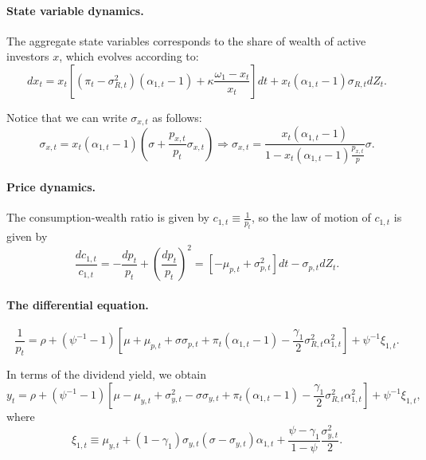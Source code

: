 \documentclass[11pt,english]{article}
\begin{document}
\paragraph{State variable dynamics.} The aggregate state variables corresponds to the share of wealth of active investors $x$, which evolves according to: 
\begin{equation}
d x_t = x_t \left[  (\pi_t-\sigma_{R,t}^2) (\alpha_{1,t}  -1)+ \kappa \frac{\omega_1 - x_t}{x_t} \right]dt + x_t (\alpha_{1,t}-1) \sigma_{R,t} dZ_t.
\end{equation}

Notice that we can write $\sigma_{x,t}$ as follows:
\begin{equation}
    \sigma_{x,t} = x_t (\alpha_{1,t}-1) \left(\sigma+\frac{p_{x,t}}{p_t} \sigma_{x,t}\right) \Rightarrow \sigma_{x,t} = \frac{x_t (\alpha_{1,t} -1)}{1- x_t (\alpha_{1,t}-1) \frac{p_{x,t}}{p}} \sigma.
\end{equation}

\paragraph{Price dynamics.} The consumption-wealth ratio is given by $c_{1,t} \equiv \frac{1}{p_t}$, so the law of motion of $c_{1,t}$ is given by
\begin{equation}
    \frac{d c_{1,t}}{c_{1,t}} = -\frac{dp_t}{p_t} + \left( \frac{d p_t}{p_t} \right)^2 = \left[ -\mu_{p,t} +\sigma_{p,t}^2 \right] dt - \sigma_{p,t} dZ_t. 
\end{equation}

\paragraph{The differential equation.}

\begin{equation}
    \frac{1}{p_t} =  \rho + (\psi^{-1}-1) \left[\mu+\mu_{p,t} + \sigma \sigma_{p,t} + \pi_t (\alpha_{1,t}-1) - \frac{\gamma_1}{2} \sigma_{R,t}^2 \alpha_{1,t}^2 \right] + \psi^{-1}\xi_{1,t}.
\end{equation}

In terms of the dividend yield, we obtain
\begin{equation}
    y_t =  \rho + (\psi^{-1}-1) \left[ \mu-\mu_{y,t}+\sigma_{y,t}^2 - \sigma \sigma_{y,t} + \pi_t (\alpha_{1,t}-1) - \frac{\gamma_1}{2} \sigma_{R,t}^2 \alpha_{1,t}^2 \right] + \psi^{-1}\xi_{1,t},
\end{equation}
where
\begin{equation}
    \xi_{1,t} \equiv \mu_{y,t} + (1-\gamma_1) \sigma_{y,t} (\sigma-\sigma_{y,t}) \alpha_{1,t} + \frac{\psi-\gamma_1}{1-\psi} \frac{\sigma_{y,t}^2}{2}.
\end{equation}
\end{document}
